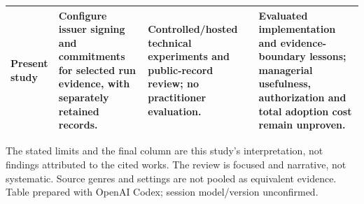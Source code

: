 \begin{table}[!htbp]
\begin{tabularx}{\textwidth}{@{}>{\raggedright\arraybackslash}p{29mm}>{\raggedright\arraybackslash}X>{\raggedright\arraybackslash}X>{\raggedright\arraybackslash}X@{}}
Present study & Configure issuer signing and commitments for selected run evidence, with separately retained records. & Controlled/hosted technical experiments and public-record review; no practitioner evaluation. & Evaluated implementation and evidence-boundary lessons; managerial usefulness, authorization and total adoption cost remain unproven. \\
\bottomrule
\end{tabularx}
\par\smallskip\noindent\begin{minipage}{\textwidth}
The stated limits and the final column are this study's interpretation, not findings attributed to the cited works. The review is focused and narrative, not systematic. Source genres and settings are not pooled as equivalent evidence. Table prepared with OpenAI Codex; session model/version unconfirmed.
\end{minipage}
\endgroup
\end{table}
